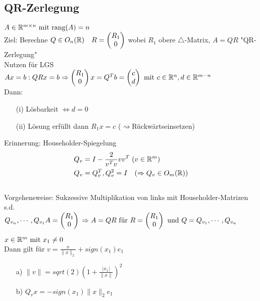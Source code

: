 \subsection{QR-Zerlegung}
$A \in \mathbb R^{m \times n} \text{ mit rang}(A) = n$\\
\newline
Ziel: Berechne $Q \in O_n(\mathbb R)\quad
				R=\begin{pmatrix}
				R_1\\0
				\end{pmatrix}$ wobei $R_1$ obere $\triangle$-Matrix,
				$A=QR$ "QR-Zerlegung"\\
\newline
Nutzen für LGS $Ax=b: QRx = b\\ \Rightarrow \begin{pmatrix} R_1\\0\end{pmatrix}x= Q^Tb = \begin{pmatrix}c\\d\end{pmatrix} \text{ mit } c\in \mathbb R^n, d \in \mathbb R^{m-n}$\\
\newline
Dann: \begin{itemize}
	\item[(i)]Lösbarkeit $\Leftrightarrow d=0$
	\item[(ii)]Lösung erfüllt dann $R_1x=c$ ($\rightsquigarrow$Rückwärtseinsetzen)
\end{itemize}
Erinnerung: Householder-Spiegelung
\begin{align*}
&Q_v=I -\frac{2}{v^Tv}vv^T \;(v\in\mathbb R^m)\\
&Q_v=Q_v^T, Q_v^2=I \quad (\Rightarrow Q_v \in O_m(\mathbb R))
\end{align*}\\
Vorgehensweise: Sukzessive Multiplikation von links mit Householder-Matrizen s.d.\\ $ Q_{v_n}, \cdots, Q_{v_1} A =\begin{pmatrix}R_1\\0\end{pmatrix}\\
\Rightarrow A =QR \text{ für } R= \begin{pmatrix}R_1\\0\end{pmatrix} \text{ und } Q=Q_{v_1},\cdots,Q_{v_n} $
\begin{Lemma}
	$x \in \mathbb R^m \text{ mit } x_1 \neq 0$\\
	\newline Dann gilt für $v = \frac{x}{\|x\|_2}+sign(x_1)e_1$
	\begin{itemize}
		\item[a)]$\|v\|=sqrt(2)(1+\frac{|x_1|}{\|x\|})^2$
		\item[b)]$Q_vx=-sign(x_1)\|x\|_2e_1$
	\end{itemize}
\end{Lemma}
